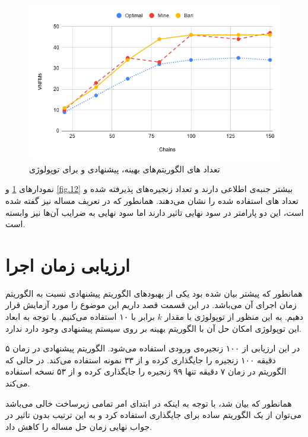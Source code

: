 \begin{figure}[h!]
\center\includegraphics[scale=.5]{images/chart-8}
\caption{تعداد های الگوریتم‌های بهینه، پیشنهادی و \cite{Bari2015} برای توپولوژی }
\label{fig.13}
\end{figure}

نمودارهای \ref{fig.13} و \ref{fig.12}
بیشتر جنبه‌ی اطلاعی دارند و تعداد زنجیره‌های پذیرفته شده و تعداد
های
استفاده شده را نشان می‌دهند.
همانطور که در تعریف مساله نیز گفته شده است، این دو پارامتر در سود نهایی تاثیر دارند
اما سود نهایی به ضرایب آن‌ها نیز وابسته است.

\section{ارزیابی زمان اجرا}

همانطور که پیشتر بیان شده بود یکی از بهبودهای الگوریتم پیشنهادی نسبت به
الگوریتم \cite{Bari2015}
زمان اجرای آن می‌باشد.
در این قسمت قصد داریم این موضوع را مورد آزمایش قرار دهیم.
به این منظور از توپولوژی  با مقدار \(k\) برابر با ۱۰ استفاده می‌کنیم.
با توجه به ابعاد این توپولوژی امکان حل آن با الگوریتم بهینه بر روی سیستم پیشنهادی وجود دارد ندارد.

در این ارزیابی از ۱۰۰ زنجیره‌ی ورودی استفاده می‌شود. الگوریتم پیشنهادی
در زمان ۵ دقیقه ۱۰۰ زنجیره را جایگذاری کرده و از ۳۳ نمونه
استفاده می‌کند. در حالی که الگوریتم \cite{Bari2015}
در زمان ۷ دقیقه تنها ۹۹ زنجیره را جایگذاری کرده و از ۵۳ نسخه
استفاده می‌کند.

همانطور که بیان شد، با توجه به اینکه در ابتدای امر تمامی زیرساخت خالی می‌باشد
می‌توان از یک الگوریتم ساده برای جایگذاری استفاده کرد و به این ترتیب
بدون تاثیر در جواب نهایی زمان حل مساله را کاهش داد.

